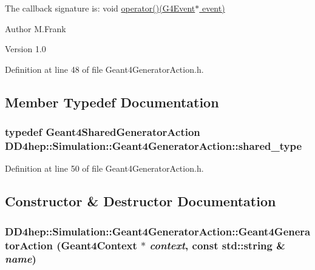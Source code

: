 The callback signature is: void \hyperlink{class_d_d4hep_1_1_simulation_1_1_geant4_generator_action_ac5a1d2335a19e3f9d555081199e01801}{operator()(G4Event$\ast$ event)}

\begin{DoxyAuthor}{Author}
M.Frank 
\end{DoxyAuthor}
\begin{DoxyVersion}{Version}
1.0 
\end{DoxyVersion}


Definition at line 48 of file Geant4GeneratorAction.h.

\subsection{Member Typedef Documentation}
\hypertarget{class_d_d4hep_1_1_simulation_1_1_geant4_generator_action_a21b579b261763b82cb86a001c8502c65}{
\subsubsection[{shared\_\-type}]{\setlength{\rightskip}{0pt plus 5cm}typedef {\bf Geant4SharedGeneratorAction} {\bf DD4hep::Simulation::Geant4GeneratorAction::shared\_\-type}}}
\label{class_d_d4hep_1_1_simulation_1_1_geant4_generator_action_a21b579b261763b82cb86a001c8502c65}


Definition at line 50 of file Geant4GeneratorAction.h.

\subsection{Constructor \& Destructor Documentation}
\hypertarget{class_d_d4hep_1_1_simulation_1_1_geant4_generator_action_a38bd8b1993559039d35c8eb5c285b7c0}{
\subsubsection[{Geant4GeneratorAction}]{\setlength{\rightskip}{0pt plus 5cm}DD4hep::Simulation::Geant4GeneratorAction::Geant4GeneratorAction ({\bf Geant4Context} $\ast$ {\em context}, \/  const std::string \& {\em name})}}
\label{class_d_d4hep_1_1_simulation_1_1_geant4_generator_action_a38bd8b1993559039d35c8eb5c285b7c0}


